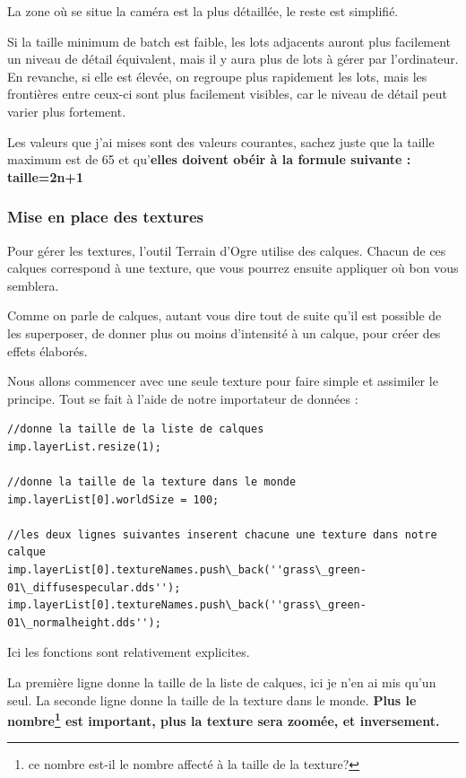 La zone o\`u se situe la cam\'era est la plus d\'etaill\'ee, le reste est simplifi\'e.

Si la taille minimum de batch est faible, les lots adjacents auront plus facilement un niveau de d\'etail \'equivalent, mais il y aura plus de lots \`a g\'erer par l'ordinateur. En revanche, si elle est \'elev\'ee, on regroupe plus rapidement les lots, mais les fronti\`eres entre ceux-ci sont plus facilement visibles, car le niveau de d\'etail peut varier plus fortement.

Les valeurs que j'ai mises sont des valeurs courantes, sachez juste que la taille maximum est de 65 et qu'\textbf{elles doivent ob\'eir \`a la formule suivante :
taille=2n+1}



\subsubsection{Mise en place des textures}

Pour g\'erer les textures, l'outil Terrain d'Ogre utilise des calques. Chacun de ces calques correspond \`a une texture, que vous pourrez ensuite appliquer o\`u bon vous semblera.

Comme on parle de calques, autant vous dire tout de suite qu'il est possible de les superposer, de donner plus ou moins d'intensit\'e \`a un calque, pour cr\'eer des effets \'elabor\'es.

Nous allons commencer avec une seule texture pour faire simple et assimiler le principe. Tout se fait \`a l'aide de notre importateur de donn\'ees :

\begin{lstlisting}[caption={Mise en place d'une texture pour le terrain}]
//donne la taille de la liste de calques
imp.layerList.resize(1);

//donne la taille de la texture dans le monde
imp.layerList[0].worldSize = 100;  

//les deux lignes suivantes inserent chacune une texture dans notre calque
imp.layerList[0].textureNames.push\_back(''grass\_green-01\_diffusespecular.dds'');
imp.layerList[0].textureNames.push\_back(''grass\_green-01\_normalheight.dds'');
\end{lstlisting}

Ici les fonctions sont relativement explicites.

La premi\`ere ligne donne la taille de la liste de calques, ici je n'en ai mis qu'un seul. La seconde ligne donne la taille de la texture dans le monde. \textbf{Plus le nombre\footnote{ce nombre est-il le nombre affect\'e \`a la taille de la texture?} est important, plus la texture sera zoom\'ee, et inversement.}

